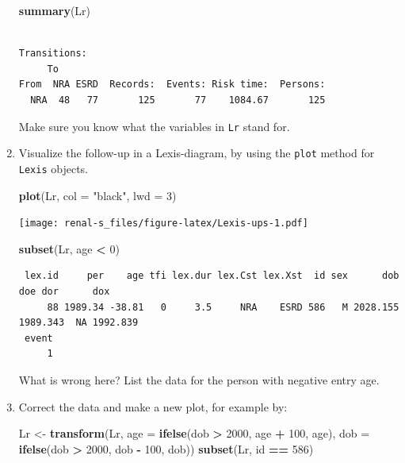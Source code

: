 \documentclass[
]{book}
\newenvironment{Shaded}{\begin{snugshade}}{\end{snugshade}}
\newcommand{\AttributeTok}[1]{\textcolor[rgb]{0.13,0.29,0.53}{#1}}
\newcommand{\DecValTok}[1]{\textcolor[rgb]{0.00,0.00,0.81}{#1}}
\newcommand{\FunctionTok}[1]{\textcolor[rgb]{0.13,0.29,0.53}{\textbf{#1}}}
\newcommand{\NormalTok}[1]{#1}
\newcommand{\OtherTok}[1]{\textcolor[rgb]{0.56,0.35,0.01}{#1}}
\newcommand{\SpecialCharTok}[1]{\textcolor[rgb]{0.81,0.36,0.00}{\textbf{#1}}}
\newcommand{\StringTok}[1]{\textcolor[rgb]{0.31,0.60,0.02}{#1}}
\begin{document}
\begin{enumerate}
\begin{Shaded}
\begin{Highlighting}[]
\FunctionTok{summary}\NormalTok{(Lr)}
\end{Highlighting}
\end{Shaded}

\begin{verbatim}

Transitions:
     To
From  NRA ESRD  Records:  Events: Risk time:  Persons:
  NRA  48   77       125       77    1084.67       125
\end{verbatim}

  Make sure you know what the variables in \texttt{Lr} stand for.
\item
  Visualize the follow-up in a Lexis-diagram, by using the
  \texttt{plot} method for \texttt{Lexis} objects.

\begin{Shaded}
\begin{Highlighting}[]
\FunctionTok{plot}\NormalTok{(Lr, }\AttributeTok{col =} \StringTok{"black"}\NormalTok{, }\AttributeTok{lwd =} \DecValTok{3}\NormalTok{)}
\end{Highlighting}
\end{Shaded}

  \texttt{[image: renal-s\_files/figure-latex/Lexis-ups-1.pdf]}

\begin{Shaded}
\begin{Highlighting}[]
\FunctionTok{subset}\NormalTok{(Lr, age }\SpecialCharTok{\textless{}} \DecValTok{0}\NormalTok{)}
\end{Highlighting}
\end{Shaded}

\begin{verbatim}
 lex.id     per    age tfi lex.dur lex.Cst lex.Xst  id sex      dob      doe dor      dox
     88 1989.34 -38.81   0     3.5     NRA    ESRD 586   M 2028.155 1989.343  NA 1992.839
 event
     1
\end{verbatim}

  What is wrong here? List the data for the person with negative entry age.
\item
  Correct the data and make a new plot, for example by:

\begin{Shaded}
\begin{Highlighting}[]
\NormalTok{Lr }\OtherTok{\textless{}{-}} \FunctionTok{transform}\NormalTok{(Lr, }\AttributeTok{age =} \FunctionTok{ifelse}\NormalTok{(dob }\SpecialCharTok{\textgreater{}} \DecValTok{2000}\NormalTok{, age }\SpecialCharTok{+} \DecValTok{100}\NormalTok{, age),}
                    \AttributeTok{dob =} \FunctionTok{ifelse}\NormalTok{(dob }\SpecialCharTok{\textgreater{}} \DecValTok{2000}\NormalTok{, dob }\SpecialCharTok{{-}} \DecValTok{100}\NormalTok{, dob))}
\FunctionTok{subset}\NormalTok{(Lr, id }\SpecialCharTok{==} \DecValTok{586}\NormalTok{)}
\end{Highlighting}
\end{Shaded}


\end{enumerate}
\end{document}
